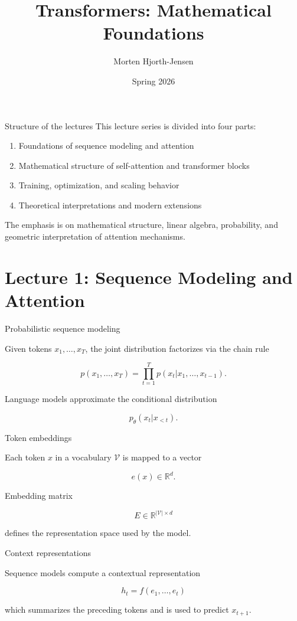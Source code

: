 \documentclass[aspectratio=169]{beamer}
\title{Transformers: Mathematical Foundations}
\author{Morten Hjorth-Jensen}
\date{Spring 2026}
\begin{document}
\frame{\titlepage}

\begin{frame}{Structure of the lectures}
This lecture series is divided into four parts:

\begin{enumerate}
\item Foundations of sequence modeling and attention
\item Mathematical structure of self-attention and transformer blocks
\item Training, optimization, and scaling behavior
\item Theoretical interpretations and modern extensions
\end{enumerate}

The emphasis is on mathematical structure, linear algebra,
probability, and geometric interpretation of attention mechanisms.
\end{frame}

\section{Lecture 1: Sequence Modeling and Attention}


\begin{frame}{Probabilistic sequence modeling}

Given tokens $x_1,\dots,x_T$, the joint distribution factorizes via the chain rule

\[
p(x_1,\dots,x_T) = \prod_{t=1}^T p(x_t|x_1,\dots,x_{t-1}).
\]

Language models approximate the conditional distribution

\[
p_\theta(x_t|x_{<t}).
\]

\end{frame}


\begin{frame}{Token embeddings}

Each token $x$ in a vocabulary $\mathcal V$ is mapped to a vector

\[
e(x) \in \mathbb{R}^d.
\]

Embedding matrix

\[
E \in \mathbb{R}^{|\mathcal V|\times d}
\]

defines the representation space used by the model.

\end{frame}


\begin{frame}{Context representations}

Sequence models compute a contextual representation

\[
h_t = f(e_1,\dots,e_t)
\]

which summarizes the preceding tokens and is used to predict $x_{t+1}$.

\end{frame}
\end{document}
